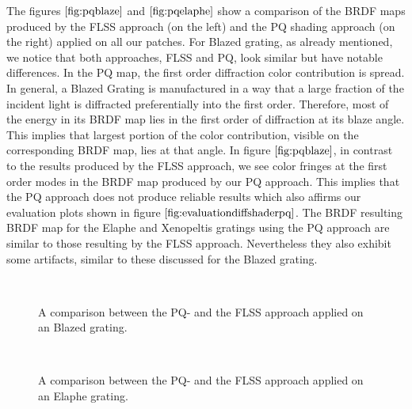 The figures $\ref{fig:pqblaze}$ and $\ref{fig:pqelaphe}$ show a comparison of the BRDF maps produced by the FLSS approach (on the left) and the PQ shading approach (on the right) applied on all our patches. For Blazed grating, as already mentioned, we notice that both approaches, FLSS and PQ, look similar but have notable differences. In the PQ map, the first order diffraction color contribution is spread. In general, a Blazed Grating is manufactured in a way that a large fraction of the incident light is diffracted preferentially into the first order. Therefore, most of the energy in its BRDF map lies in the first order of diffraction at its blaze angle. This implies that largest portion of the color contribution, visible on the corresponding BRDF map, lies at that angle. In figure $\ref{fig:pqblaze}$, in contrast to the results produced by the FLSS approach, we see color fringes at the first order modes in the BRDF map produced by our PQ approach. This implies that the PQ approach does not produce reliable results which also affirms our evaluation plots shown in figure $\ref{fig:evaluationdiffshaderpq}$. The BRDF resulting BRDF map for the Elaphe and Xenopeltis gratings using the PQ approach are similar to those resulting by the FLSS approach. Nevertheless they also exhibit some artifacts, similar to these discussed for the Blazed grating.

\begin{figure}[H]
  \centering
~
\caption[BRDF Map: PQ vs FLSS Approach on Blazed Grating]{A comparison between the PQ- and the FLSS approach applied on an Blazed grating.}
\label{fig:pqblaze}
\end{figure}

\begin{figure}[H]
  \centering
~

\caption[BRDF Map: PQ vs FLSS Approach on Elaphe Grating]{A comparison between the PQ- and the FLSS approach applied on an Elaphe grating.}
\label{fig:pqelaphe}
\end{figure}

